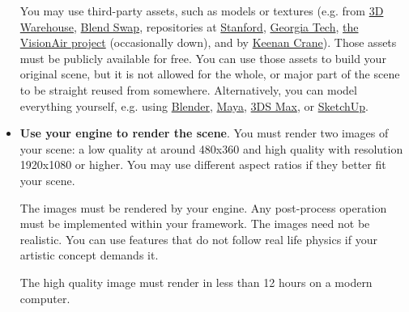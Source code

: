 \documentclass[addpoints]{exam}
\begin{document}
\begin{questions}
\begin{itemize}
  You may use third-party assets, such as models or textures (e.g. from \href{https://3dwarehouse.sketchup.com}{3D Warehouse}, \href{https://www.blendswap.com}{Blend Swap}, repositories at \href{http://graphics.stanford.edu/data/3Dscanrep/}{Stanford}, \href{https://www.cc.gatech.edu/projects/large_models/}{Georgia Tech}, \href{http://visionair.ge.imati.cnr.it/ontologies/shapes/viewmodels.jsp}{the VisionAir project} (occasionally down), and by \href{https://www.cs.cmu.edu/~kmcrane/Projects/ModelRepository/}{Keenan Crane}). Those assets must be publicly available for free. You can use those assets to build your original scene, but it is not allowed for the whole, or major part of the scene to be straight reused from somewhere. Alternatively, you can model everything yourself, e.g. using \href{https://www.blender.org}{Blender}, \href{https://www.autodesk.com/products/maya/overview}{Maya}, \href{https://www.autodesk.com/products/3ds-max/overview}{3DS Max}, or \href{https://www.sketchup.com}{SketchUp}.

  \item \textbf{Use your engine to render the scene}. You must render two images of your scene: a low quality at around 480x360 and high quality with resolution 1920x1080 or higher. You may use different aspect ratios if they better fit your scene.
  
  The images must be rendered by your engine. Any post-process operation must be implemented within your framework. The images need not be realistic. You can use features that do not follow real life physics if your artistic concept demands it.
  
The high quality image must render in less than 12 hours on a modern computer.


\end{itemize}
\end{questions}
\end{document}
